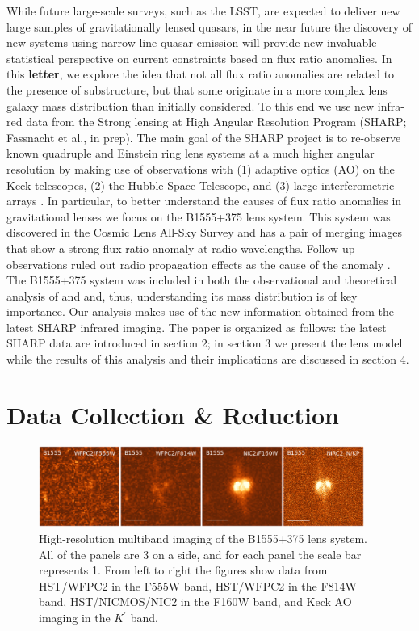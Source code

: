 \documentclass[useAMS,usenatbib]{mn2e}
\begin{document}
While future large-scale surveys, such as the LSST, are expected to
deliver new large samples of gravitationally lensed quasars, in the
near future the discovery of new systems using narrow-line quasar
emission \citep{N14} will provide new invaluable statistical
perspective on current constraints based on flux ratio anomalies.  In
this {\bf letter}, we explore the idea that not all flux ratio anomalies are
related to the presence of substructure, but that some originate in a
more complex lens galaxy mass distribution than initially
considered. To this end we use new infra-red data from the Strong
lensing at High Angular Resolution Program (SHARP; Fassnacht et al.,
in prep). The main goal of the SHARP project is to re-observe known
quadruple and Einstein ring lens systems at a much higher angular
resolution by making use of observations with (1) adaptive optics (AO)
on the Keck telescopes, (2) the Hubble Space Telescope, and (3) large
interferometric arrays \citep{SHARP12,V12}. In particular, to better
understand the causes of flux ratio anomalies in gravitational lenses
we focus on the B1555+375 lens system\citep{Marlow99}.  This system was
discovered in the Cosmic Lens All-Sky Survey \citep{CLASS1,CLASS2} and
has a pair of merging images that show a strong flux ratio anomaly at
radio wavelengths.  Follow-up observations ruled out radio propagation
effects as the cause of the anomaly \citep{K03,KD04}.  The B1555+375
system was included in both the observational and theoretical analysis
of \citet{Dalal2002} and \citet{Xu14} and, thus, understanding its
mass distribution is of key importance.  Our analysis makes use of
the new information obtained from the latest SHARP infrared imaging.
The paper is organized as follows: the latest SHARP data are
introduced in section 2; in section 3 we present the lens model while
the results of this analysis and their implications are discussed in
section 4.

\section{Data Collection \& Reduction}

\begin{figure}
\includegraphics[width=0.95\textwidth]{B1555_gallery.eps}
\caption{High-resolution multiband imaging of the B1555+375 lens system.
All of the panels are 3 on a side, and for each panel the scale bar 
represents 1\arcsec.  From left to right the figures show data from
HST/WFPC2 in the F555W band, HST/WFPC2 in the F814W band, HST/NICMOS/NIC2
in the F160W band, and Keck AO imaging in the $K^\prime$ band.
\label{fig:multiband}}
%

\end{figure}
\end{document}
